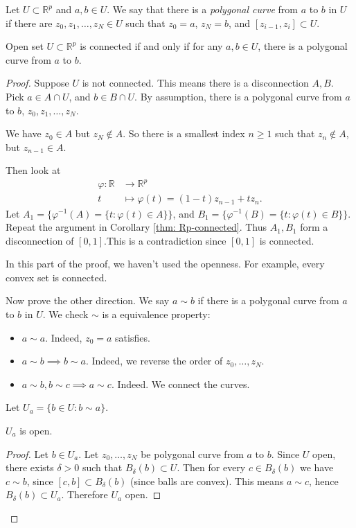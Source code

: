 
Let $U \subset \mathbb{R}^p$ and  $a,b \in U$. We say that there is a \textit{polygonal curve} from $a$ to $b$ in $U$ if there are $z_0,z_1,\ldots,z_N \in U$ such that $z_0 = a$, $z_N = b$, and $[z_{i-1 }, z_i] \subset U$.

\begin{theorem}
	Open set $U \subset \mathbb{R}^p$ is connected if and only if for any $a, b \in U$, there is a polygonal curve from $a$ to $b$.
\end{theorem}
\begin{proof}
	Suppose $U$ is not connected. This means there is a disconnection $A,B$. Pick $a \in A \cap U$, and $b \in B \cap U$. By assumption, there is a polygonal curve from $a$ to $b $, $z_0,z_1,\ldots,z_N$.

	We have $z_0 \in A$ but $z_N \not\in A$. So there is a smallest index $n \ge 1$ such that $z_n \not\in A$, but $z_{n-1 } \in A$.

	Then  look at 
	\begin{align*}
		\varphi: \mathbb{R} &\longrightarrow \mathbb{R}^p \\
		t &\longmapsto \varphi(t) = (1-t)z_{n-1} + tz_n
	.\end{align*}
Let $A_1 = \{\varphi^{-1}(A) = \{t: \varphi(t) \in A\} \} $, and 
	$B_1 = \{\varphi^{-1}(B) = \{t: \varphi(t) \in B\} \} $. 
	Repeat the argument in Corollary \ref{thm: Rp-connected}. Thus 
	$A_1, B_1 $ form a disconnection of $[0,1]$.This is a contradiction since $[0,1]$ is connected.

	\begin{remark}
		In this part of the proof, we haven't used the openness. For example, every convex set is connected.
	\end{remark}

	Now prove the other direction. We say $a \sim b$ if there is a polygonal curve from  $a$ to $b$ in $U$. We check $\sim $ is a equivalence property:
	\begin{itemize}
		\item $a \sim a$. Indeed, $z_0 = a$ satisfies.
		\item $a\sim b \implies b \sim a$. Indeed, we reverse the order of $z_0,\ldots,z_N$.
		\item $a\sim b, b\sim c \implies a\sim c$. Indeed. We connect the curves.
	\end{itemize}
	Let $U_a = \{b \in U: b \sim a\} $.
	\begin{claim}
		$U_a$ is open.
	\end{claim}
	\begin{proof}
		Let $b \in U_a$. Let $z_0,\ldots,z_N$ be polygonal curve from $a$ to $b$. Since $U$ open, there exists $\delta>0$ such that $B_\delta(b) \subset U$. Then for every $c \in B_\delta(b)$ we have $c \sim b$, since $[c,b] \subset B_\delta(b)$ (since balls are convex). This means $a \sim c$, hence $B_\delta(b) \subset U_a$. Therefore  $U_a$ open.
	\end{proof}


\end{proof}
